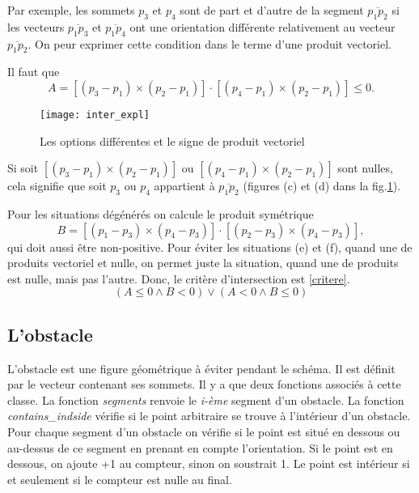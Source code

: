 \documentclass[12pt]{article}
\begin{document}
	Par exemple, les sommets $p_3$ et $p_4$ sont de part et d'autre de la segment $\overline{p_1p_2}$ si les vecteurs  $\overline{p_1p_3}$ et $\overline{p_1p_4}$ ont une orientation différente relativement au vecteur $\overline{p_1p_2}$. On peur exprimer cette condition dans le terme d'une produit vectoriel.
	
	Il faut que 
	\begin{equation}
	A = [(p_3 - p_1) \times (p_2 - p_1)]\cdot[(p_4 - p_1) \times (p_2 - p_1)] \leq 0.
	\end{equation}
	\begin{figure}
		\centering
		\texttt{[image: inter\_expl]}
		\caption{Les options différentes et le signe de produit vectoriel}
		\label{intersect_expl}
	\end{figure}
	Si soit  $[(p_3 - p_1) \times (p_2 - p_1)]$ ou $[(p_4 - p_1) \times (p_2 - p_1)]$ sont nulles, cela signifie que soit $p_3$ ou $p_4$ appartient à $\overline{p_1p_2}$ (figures (c) et (d) dans la fig.\ref{intersect_expl}).
	
	Pour les situations dégénérés on calcule le produit symétrique
	\begin{equation}
	B = [(p_1 - p_3) \times (p_4 - p_3)]\cdot[(p_2 - p_3) \times (p_4 - p_3)],
	\end{equation}
	qui doit aussi être non-positive.
	Pour éviter les situations (e) et (f), quand une de produits vectoriel et nulle, on permet juste la situation, quand une de produits est nulle, mais pas l'autre. Donc, le critère d'intersection est \eqref{critere}.
	\begin{equation}
	\label {critere}
	(A \leq 0 \wedge B <0) \vee (A < 0 \wedge B \leq 0) 
	\end{equation}
	\subsection{L'obstacle}
	L'obstacle est une figure géométrique à éviter pendant le schéma. Il est définit par le vecteur contenant ses sommets. Il y a que deux fonctions associés à cette classe. La fonction \textit{segments} renvoie le \textit{i-ème} segment d'un obstacle.
	La fonction \textit{contains\_indside} vérifie si le point arbitraire se trouve à l'intérieur d'un obstacle. Pour chaque segment d'un obstacle on vérifie si le point est situé en dessous ou au-dessus de ce segment en prenant en compte l'orientation. Si le point est en dessous, on ajoute +1 au compteur, sinon on soustrait 1. Le point est intérieur si et seulement si le compteur est nulle au final.
\end{document}
